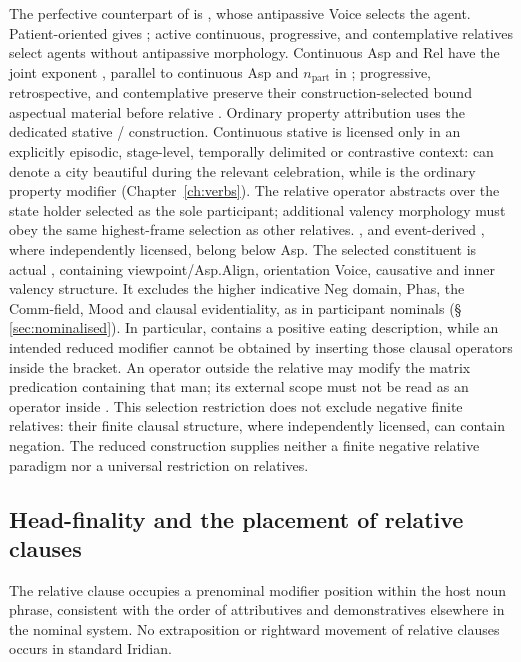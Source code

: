 The perfective counterpart of  is
, whose antipassive Voice selects the agent. Patient-oriented
 gives ; active continuous, progressive, and
contemplative relatives select agents without antipassive morphology.
Continuous Asp and Rel have the joint exponent , parallel to
continuous Asp and $n_{\mathrm{part}}$ in ; progressive,
retrospective, and contemplative preserve their construction-selected bound
aspectual material before relative . Ordinary property attribution
uses the dedicated stative / construction. Continuous
stative  is licensed only in an explicitly episodic, stage-level,
temporally delimited or contrastive context:  can denote
a city beautiful during the relevant celebration, while 
is the ordinary property modifier (Chapter~\ref{ch:verbs}). The relative
operator abstracts over the state holder selected as the sole participant;
additional valency morphology must obey the same highest-frame selection as
other relatives. ,  and event-derived
, where independently licensed, belong below Asp.
The selected constituent is actual
, containing viewpoint/Asp.Align, orientation Voice, causative
and inner valency structure. It excludes the higher indicative Neg domain,
Phas, the Comm-field, Mood and clausal evidentiality, as in participant
nominals (§\,\ref{sec:nominalised}). In particular,
 contains a positive eating description, while
an intended reduced modifier  cannot be obtained by inserting those clausal operators inside the
bracket. An operator outside the relative may modify the matrix predication
containing that man; its external scope must not be read as an operator inside
. This selection restriction does not exclude negative finite
relatives: their finite clausal structure, where independently licensed, can
contain negation. The reduced  construction supplies neither a
finite negative relative paradigm nor a universal restriction on relatives.

\subsection{Head-finality and the placement of relative clauses}
\label{sec:th-rel-headfinal}

The relative clause occupies a prenominal modifier position within the host
noun phrase, consistent with the order of attributives and demonstratives
elsewhere in the nominal system. No extraposition or rightward movement of
relative clauses occurs in standard Iridian.

